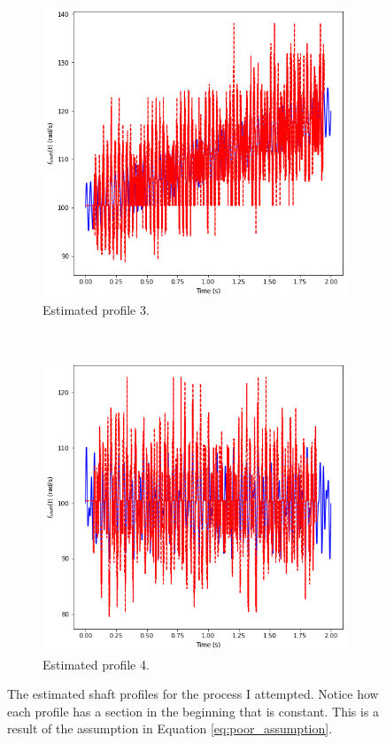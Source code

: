\documentclass{article}
\begin{document}
\begin{figure}[htb!]
		\begin{subfigure}[b]{0.45\textwidth}
			\centering
			\includegraphics[width=\textwidth]{Q4_f3_2.png}
			\caption{Estimated profile 3.}
		\end{subfigure}
		~
		\begin{subfigure}[b]{0.45\textwidth}
			\centering
			\includegraphics[width=\textwidth]{Q4_f4_2.png}
			\caption{Estimated profile 4.}
		\end{subfigure}
		
		\caption{The estimated shaft profiles for the process I attempted. Notice how each profile has a section in the beginning that is constant. This is a result of the assumption in Equation \eqref{eq:poor_assumption}.}
		\label{fig:Q4_estimated_profiles_me}
	\end{figure}
	
\end{document}
